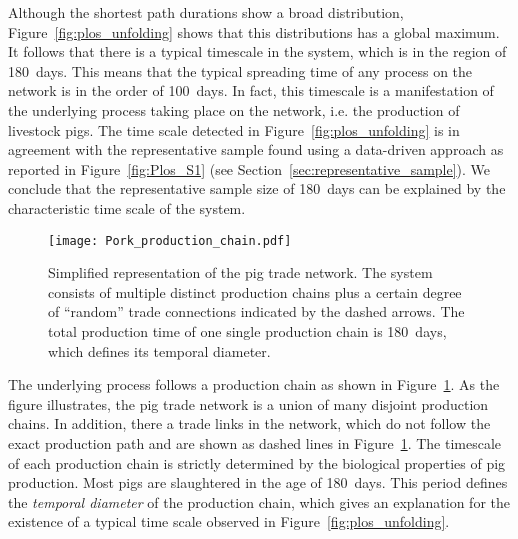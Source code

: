 Although the shortest path durations show a broad distribution, Figure~\ref{fig:plos_unfolding} shows that this distributions has a global maximum.
It follows that there is a typical timescale in the system, which is in the region of 180~days.
This means that the typical spreading time of any process on the network is in the order of 100~days.
In fact, this timescale is a manifestation of the underlying process taking place on the network, i.e. the production of livestock pigs.
The time scale detected in Figure~\ref{fig:plos_unfolding} is in agreement with the representative sample found using a data-driven approach as reported in Figure~\ref{fig:Plos_S1} (see Section~\ref{sec:representative_sample}).
We conclude that the representative sample size of 180~days can be explained by the characteristic time scale of the system.

%
\begin{figure}[htb]
\begin{center}
\texttt{[image: Pork\_production\_chain.pdf]}
\caption{Simplified representation of the pig trade network.
The system consists of multiple distinct production chains plus a certain degree of ``random'' trade connections indicated by the dashed arrows.
The total production time of one single production chain is 180~days, which defines its temporal diameter.}
\label{fig:pork_production_chain}
\end{center}
\end{figure}
%
The underlying process follows a production chain as shown in Figure~\ref{fig:pork_production_chain}.
As the figure illustrates, the pig trade network is a union of many disjoint production chains.
In addition, there a trade links in the network, which do not follow the exact production path and are shown as dashed lines in Figure~\ref{fig:pork_production_chain}.
The timescale of each production chain is strictly determined by the biological properties of pig production.
Most pigs are slaughtered in the age of 180~days.
This period defines the \emph{temporal diameter} of the production chain, which gives an explanation for the existence of a typical time scale observed in Figure~\ref{fig:plos_unfolding}.

